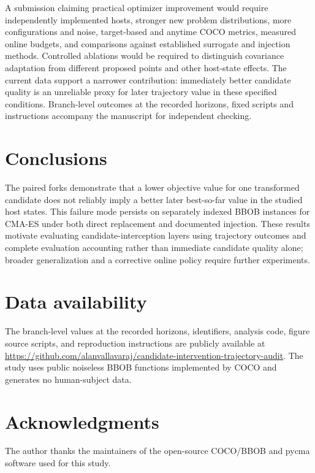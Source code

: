 \documentclass[10pt,letterpaper]{article}
\begin{document}
A submission claiming practical optimizer improvement would require independently implemented hosts, stronger new problem distributions, more configurations and noise, target-based and anytime COCO metrics, measured online budgets, and comparisons against established surrogate and injection methods. Controlled ablations would be required to distinguish covariance adaptation from different proposed points and other host-state effects. The current data support a narrower contribution: immediately better candidate quality is an unreliable proxy for later trajectory value in these specified conditions. Branch-level outcomes at the recorded horizons, fixed scripts and instructions accompany the manuscript for independent checking.

\section*{Conclusions}
The paired forks demonstrate that a lower objective value for one transformed candidate does not reliably imply a better later best-so-far value in the studied host states. This failure mode persists on separately indexed BBOB instances for CMA-ES under both direct replacement and documented injection. These results motivate evaluating candidate-interception layers using trajectory outcomes and complete evaluation accounting rather than immediate candidate quality alone; broader generalization and a corrective online policy require further experiments.

\section*{Data availability}
The branch-level values at the recorded horizons, identifiers, analysis code, figure source scripts, and reproduction instructions are publicly available at \url{https://github.com/alanvallavaraj/candidate-intervention-trajectory-audit}. The study uses public noiseless BBOB functions implemented by COCO and generates no human-subject data.

\section*{Acknowledgments}
The author thanks the maintainers of the open-source COCO/BBOB and pycma software used for this study.

\nolinenumbers

\end{document}
